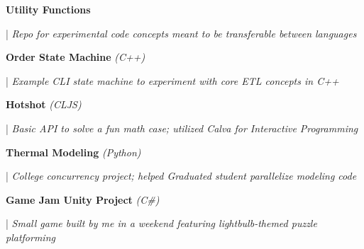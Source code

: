 \documentclass[letterpaper,11pt]{article}
\begin{document}
\begin{minipage}[t]{0.28\textwidth}
	\raggedright
	\textbf{ Utility Functions } \\
\end{minipage}
\hfill
\begin{minipage}[t]{0.70\textwidth}
	\raggedright
	|\textit{ Repo for experimental code concepts meant to be transferable between languages } \\
\end{minipage}

\begin{minipage}[t]{0.28\textwidth}
	\raggedright
	\textbf{ Order State Machine }\textit{(C++)}\\
\end{minipage}
\hfill
\begin{minipage}[t]{0.70\textwidth}
	\raggedright
	|\textit{ Example CLI state machine to experiment with core ETL concepts in C++ } \\
\end{minipage}

\begin{minipage}[t]{0.28\textwidth}
	\raggedright
	\textbf{ Hotshot }\textit{(CLJS)}\\
\end{minipage}
\hfill
\begin{minipage}[t]{0.70\textwidth}
	\raggedright
	|\textit{ Basic API to solve a fun math case; utilized Calva for Interactive Programming  } \\
\end{minipage}

\begin{minipage}[t]{0.28\textwidth}
	\raggedright
	\textbf{ Thermal Modeling }\textit{(Python)}\\
\end{minipage}
\hfill
\begin{minipage}[t]{0.70\textwidth}
	\raggedright
	|\textit{ College concurrency project; helped Graduated student parallelize modeling code } \\
\end{minipage}

\begin{minipage}[t]{0.28\textwidth}
	\raggedright
	\textbf{ Game Jam Unity Project }\textit{(C\#)} \\
\end{minipage}
\hfill
\begin{minipage}[t]{0.70\textwidth}
	\raggedright
	|\textit{ Small game built by me in a weekend featuring lightbulb-themed puzzle platforming} \\
\end{minipage}
\end{document}
